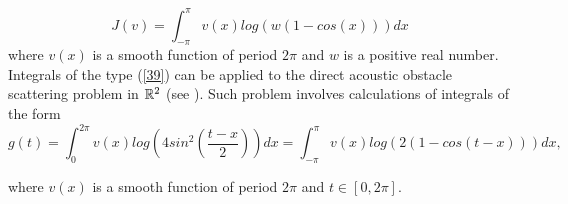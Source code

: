 \documentclass[../document.tex]{subfiles}
\begin{document}
	\begin{equation} \label{39}
		J(v) = \int_{-\pi}^{\pi} v(x) log(w( 1-cos(x) )) dx
	\end{equation}
	where $v(x)$ is a  smooth function of period $2\pi$ and $w$ is a positive real number. Integrals of the type (\ref{39}) can be applied to the direct acoustic obstacle scattering problem in $\mathbb{R}^2$ (see \cite{colton1998inverse}). Such problem involves calculations of integrals of the form
	\begin{equation}
		g(t) = \int_{0}^{2\pi} v(x) log(4 sin^2( \frac{t-x}{2}))dx = 
		\int_{-\pi}^{\pi}      v(x) log(2(1 - cos(t - x)))dx,
	\end{equation}
	
	where $v(x)$ is a  smooth function of period $2\pi$ and $t \in [0,2\pi]$.
	
	
\end{document}
